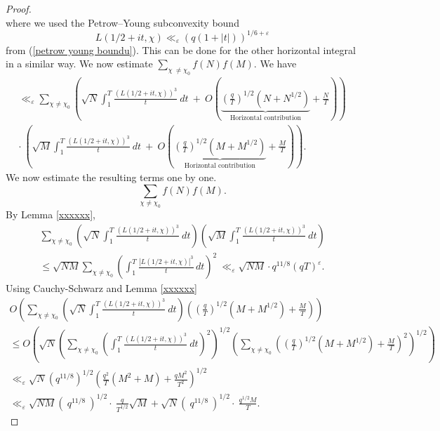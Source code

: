 \documentclass[oneside,reqno,10pt]{amsart}
\numberwithin{equation}{section}
\theoremstyle{plain}
\theoremstyle{definition}
\numberwithin{equation}{section}
\begin{document}
\begin{proof}
\begin{equation}
\end{equation}
where we used the Petrow–Young subconvexity bound 
\begin{equation}\label{2 petrow young boundu}
    L(1/2+it,\chi)\ll_\varepsilon (q(1+|t|))^{1/6+\varepsilon}
\end{equation}
from (\ref{petrow young boundu}). This can be done for the other horizontal integral in a similar way. 
We now estimate $\sum_{\chi\ \neq \chi_0} f(N)f(M)$. We have
\begin{multline}\label{mainpart}
     \ll_{\varepsilon} \sum_{\chi\neq \chi_0} \left(\sqrt{N} \int_{1}^T \frac{\left(L(1/2+it,\chi)\right)^3}{t}\  dt \ +\ O\left(\underbrace{\left(\frac{q}{T}\right)^{1/2} (N+N^{1/2})}_{\text{Horizontal contribution}}+\frac{N}{T}\right)\right) \\
    \cdot\ \left(\sqrt{M} \int_{1}^T \frac{\left(L(1/2+it,\chi)\right)^3}{t}\  dt \ +\ O\left(\underbrace{\left(\frac{q}{T}\right)^{1/2} (M+M^{1/2})}_{\text{Horizontal contribution}}+\frac{M}{T}\right)\right).
\end{multline}
We now estimate the resulting terms one by one. 
\begin{equation*}
    \sum_{\chi\neq\chi_0} f(N)f(M).
\end{equation*}
By Lemma \ref{xxxxxx},
\begin{multline}\label{peron part 1}
    \sum_{\chi \neq \chi_0} \left(\sqrt{N} \int_{1}^T \frac{\left(L(1/2+it,\chi)\right)^3}{t}\  dt\right) \left(\sqrt{M} \int_{1}^T \frac{\left(L(1/2+it,\chi)\right)^3}{t}\  dt\right)\\ 
   \leq \sqrt{NM}\sum
   _{\chi \neq \chi_0} \left(\int_{1}^T\frac{|L(1/2+it,\chi)|^3}{t}\,dt\right)^2\ \ll_{\varepsilon} \sqrt{NM}\cdot q^{11/8}(qT)^{\varepsilon}.
\end{multline}
Using Cauchy-Schwarz and Lemma \ref{xxxxxx}
\begin{multline}\label{peron part 2}
   O\left( \sum_{\chi \neq \chi_0} \left(\sqrt{N} \int_{1}^T \frac{\left(L(1/2+it,\chi)\right)^3}{t}\  dt\right) \left( \left(\frac{q}{T}\right)^{1/2} (M+M^{1/2})+\frac{M}{T}\right)\right)\\
  \le O\left(\sqrt{N} \left(\sum_{\chi \neq \chi_0} \left( \int_{1}^T \frac{\left(L(1/2+it,\chi)\right)^3}{t}\  dt\right)^2\right)^{1/2}\left(\sum_{\chi\neq\chi_0}\left( \left(\frac{q}{T}\right)^{1/2} (M+M^{1/2})+\frac{M}{T}\right)^2 \right)^{1/2}\right)\\
  \ll_{\varepsilon} \sqrt{N} (q^{11/8})^{1/2} \left(\frac{q^2}{T} (M^2+M)+\frac{qM^2}{T^2}\right)^{1/2}\\ \ll_{\varepsilon} \sqrt{NM} (\ q^{11/8}\ )^{1/2}\cdot\ \frac{q}{T^{1/2}}\sqrt{M} + \sqrt{N}(\ q^{11/8}\ )^{1/2} \cdot\ \frac{q^{1/2}M}{T}.

\end{multline}
\end{proof}
\end{document}
